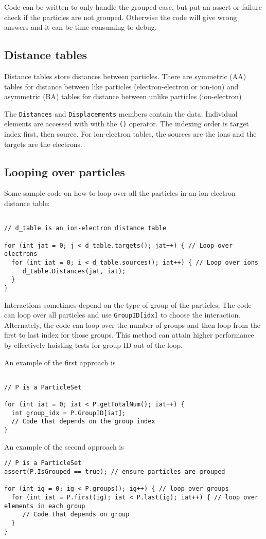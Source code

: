 Code can be written to only handle the grouped case, but put an assert or failure check if the particles are not grouped.  Otherwise the code will give wrong answers and it can be time-consuming to debug.

\subsection{Distance tables}

Distance tables store distances between particles.
There are symmetric (AA) tables for distance between like particles (electron-electron or ion-ion) and asymmetric (BA) tables for distance between unlike particles (ion-electron)

The \texttt{Distances} and \texttt{Displacements} members contain the data.
Individual elements are accessed with with the \texttt{()} operator.
The indexing order is target index first, then source.
For ion-electron tables, the sources are the ions and the targets are the electrons.

\subsection{Looping over particles}

Some sample code on how to loop over all the particles in an ion-electron distance table:
\begin{verbatim}

// d_table is an ion-electron distance table

for (int jat = 0; j < d_table.targets(); jat++) { // Loop over electrons
  for (int iat = 0; i < d_table.sources(); iat++) { // Loop over ions
     d_table.Distances(jat, iat);
  }
}
\end{verbatim}

Interactions sometimes depend on the type of group of the particles.
The code can loop over all particles and use \texttt{GroupID[idx]} to choose the interaction.
Alternately, the code can loop over the number of groups and then loop from the first to last index for those groups.  This method can attain higher performance by effectively hoisting tests for group ID out of the loop.

An example of the first approach is
\begin{verbatim}

// P is a ParticleSet

for (int iat = 0; iat < P.getTotalNum(); iat++) {
  int group_idx = P.GroupID[iat];
  // Code that depends on the group index
}
\end{verbatim}


An example of the second approach is
\begin{verbatim}
// P is a ParticleSet
assert(P.IsGrouped == true); // ensure particles are grouped

for (int ig = 0; ig < P.groups(); ig++) { // loop over groups
  for (int iat = P.first(ig); iat < P.last(ig); iat++) { // loop over elements in each group
     // Code that depends on group
  }
}

\end{verbatim}


